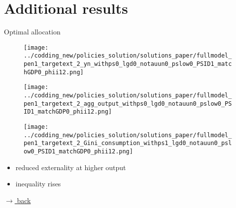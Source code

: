 \documentclass[11pt,aspectratio=169]{beamer}
\newcommand{\tr}[1]{\textcolor{blue}{#1}}
\begin{document}
	\section{Additional results}
		\begin{frame}{Optimal allocation}
		\vspace{-5mm}
		\hypertarget{backallo}{}
		\begin{figure}			
			\begin{minipage}[]{0.32\textwidth}
				\texttt{[image: ../codding\_new/policies\_solution/solutions\_paper/fullmodel\_pen1\_targetext\_2\_yn\_withps0\_lgd0\_notauun0\_pslow0\_PSID1\_matchGDP0\_phii12.png]}
			\end{minipage}	
			\begin{minipage}[]{0.32\textwidth}
				\texttt{[image: ../codding\_new/policies\_solution/solutions\_paper/fullmodel\_pen1\_targetext\_2\_agg\_output\_withps0\_lgd0\_notauun0\_pslow0\_PSID1\_matchGDP0\_phii12.png]}
			\end{minipage}
			\begin{minipage}[]{0.32\textwidth}
				\texttt{[image: ../codding\_new/policies\_solution/solutions\_paper/fullmodel\_pen1\_targetext\_2\_Gini\_consumption\_withps1\_lgd0\_notauun0\_pslow0\_PSID1\_matchGDP0\_phii12.png]}
			\end{minipage}
		\end{figure}
		\begin{itemize}
			\item reduced externality at higher output
			\item inequality rises
		\end{itemize}
		\vspace{-1mm}
		\hfill
		\hyperlink{backopt}{\tiny{$\rightarrow$ back}}
	\end{frame}	
	
\end{document}
